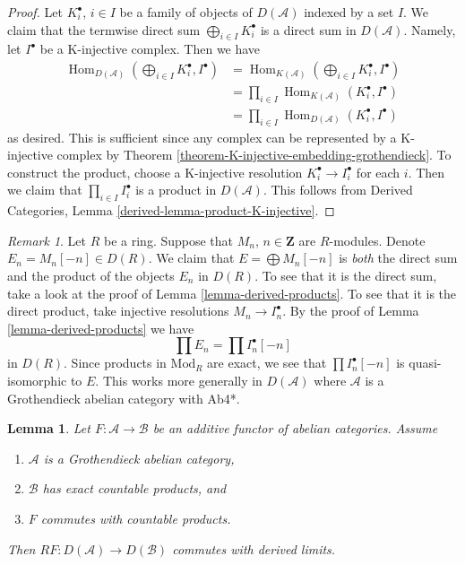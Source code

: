 \documentclass{stacks-project}
\theoremstyle{plain}
\newtheorem{lemma}[subsection]{Lemma}
\theoremstyle{definition}
\theoremstyle{remark}
\newtheorem{remark}[subsection]{Remark}
\numberwithin{equation}{subsection}
\def\Hom{\mathop{\mathrm{Hom}}\nolimits}
\begin{document}
\begin{proof}
Let $K^\bullet_i$, $i \in I$ be a family of objects of $D(\mathcal{A})$
indexed by a set $I$. We claim that the termwise direct sum
$\bigoplus_{i \in I} K^\bullet_i$ is a direct sum in $D(\mathcal{A})$.
Namely, let $I^\bullet$ be a K-injective complex. Then we have
\begin{align*}
\Hom_{D(\mathcal{A})}(\bigoplus\nolimits_{i \in I} K^\bullet_i, I^\bullet)
& =
\Hom_{K(\mathcal{A})}(\bigoplus\nolimits_{i \in I} K^\bullet_i, I^\bullet) \\
& =
\prod\nolimits_{i \in I} \Hom_{K(\mathcal{A})}(K^\bullet_i, I^\bullet) \\
& =
\prod\nolimits_{i \in I} \Hom_{D(\mathcal{A})}(K^\bullet_i, I^\bullet)
\end{align*}
as desired. This is sufficient since any complex can be represented
by a K-injective complex by
Theorem \ref{theorem-K-injective-embedding-grothendieck}.
To construct the product, choose a K-injective resolution
$K_i^\bullet \to I_i^\bullet$ for each $i$. Then we claim that
$\prod_{i \in I} I_i^\bullet$ is a product in $D(\mathcal{A})$.
This follows from
Derived Categories, Lemma \ref{derived-lemma-product-K-injective}.
\end{proof}

\begin{remark}
\label{remark-direct-sum-product-derived}
Let $R$ be a ring. Suppose that $M_n$, $n \in \mathbf{Z}$ are $R$-modules.
Denote $E_n = M_n[-n] \in D(R)$. We claim that $E = \bigoplus M_n[-n]$ is
{\it both} the direct sum and the product of the objects $E_n$ in $D(R)$.
To see that it is the direct sum, take a look at the proof of
Lemma \ref{lemma-derived-products}.
To see that it is the direct product, take injective resolutions
$M_n \to I_n^\bullet$. By the proof of
Lemma \ref{lemma-derived-products}
we have
$$
\prod E_n = \prod I_n^\bullet[-n]
$$
in $D(R)$. Since products in $\text{Mod}_R$ are exact, we see that
$\prod I_n^\bullet[-n]$ is quasi-isomorphic to $E$. This works more generally
in $D(\mathcal{A})$ where $\mathcal{A}$ is a Grothendieck abelian
category with Ab4*.
\end{remark}

\begin{lemma}
\label{lemma-RF-commutes-with-Rlim}
Let $F : \mathcal{A} \to \mathcal{B}$ be an additive functor of
abelian categories. Assume
\begin{enumerate}
\item $\mathcal{A}$ is a Grothendieck abelian category,
\item $\mathcal{B}$ has exact countable products, and
\item $F$ commutes with countable products.
\end{enumerate}
Then
$RF : D(\mathcal{A}) \to D(\mathcal{B})$ commutes with derived limits.
\end{lemma}
\end{document}
